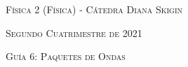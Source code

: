 \documentclass[11pt,spanish]{article}
\begin{document}
    \begin{center}
    \textsc{\large Física 2 (Física) - Cátedra Diana Skigin}
    \par\end{center}{\large \par}
    
    \begin{center}
    \textsc{\large Segundo Cuatrimestre de 2021}
    \par\end{center}{\large \par}
    
    \begin{center}
    \textsc{\large Guía 6: Paquetes de Ondas}
    \par\end{center}{\large \par}
\end{document}
